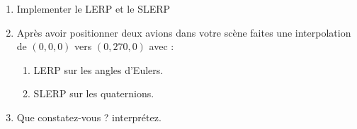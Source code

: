 \documentclass[a4paper,12pt]{article}
\begin{document}

\begin{enumerate}
    \item Implementer le LERP et le SLERP
    \item Après avoir positionner deux avions dans votre scène faites une interpolation de $(0,0,0)$ vers $(0,270,0)$ avec :
    \begin{enumerate}
        \item LERP sur les angles d'Eulers.
        \item SLERP sur les quaternions.        
    \end{enumerate}
    \item Que constatez-vous ? interprétez.
\end{enumerate}
\end{document}
